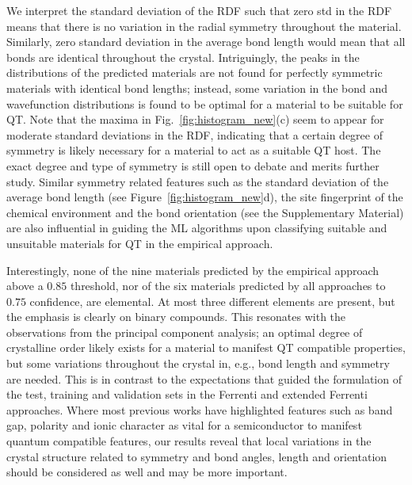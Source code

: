 \documentclass[superscriptaddress,unsortedaddress,
 amsmath,amssymb,
 aps,
]{revtex4-2}
\begin{document}
We interpret the standard deviation  of the RDF such that zero std in the RDF means that there is no variation in the radial symmetry throughout the material. Similarly, zero standard deviation in the average bond length would mean that all bonds are identical throughout the crystal. Intriguingly, the peaks in the distributions of the predicted materials are not found for perfectly symmetric materials with identical bond lengths; instead, some variation in the bond and wavefunction distributions is found to be optimal for a material to be suitable for QT.  
Note that the maxima in Fig.~\ref{fig:histogram_new}(c) seem to appear for moderate standard deviations in the RDF, indicating that a certain degree of symmetry is likely necessary for a material to act as a suitable QT host. The exact degree and type of symmetry is still open to debate and merits further study. 
Similar symmetry related features such as the standard deviation of the average bond length (see Figure~\ref{fig:histogram_new}d), the site fingerprint of the chemical environment and the bond orientation (see the Supplementary Material) are also influential in guiding the ML algorithms upon classifying suitable and unsuitable materials for QT in the empirical approach. 


Interestingly, none of the nine materials predicted by the empirical approach above a $0.85$ threshold, nor of the six materials predicted by all approaches to $0.75$ confidence, are elemental. At most three different elements are present, but the emphasis is clearly on binary compounds. This resonates with the observations from the principal component analysis; an optimal degree of crystalline order likely exists for a material to manifest QT compatible properties, but some variations throughout the crystal in, e.g., bond length and symmetry are needed. This is in contrast to the expectations that guided the formulation of the test, training and validation sets in the Ferrenti and extended Ferrenti approaches. Where most previous works have highlighted features such as band gap, polarity and ionic character as vital for a semiconductor to manifest quantum compatible features, our results reveal that local variations in the crystal structure related to symmetry and bond angles, length and orientation should be considered as well and may be more important. 
\end{document}

